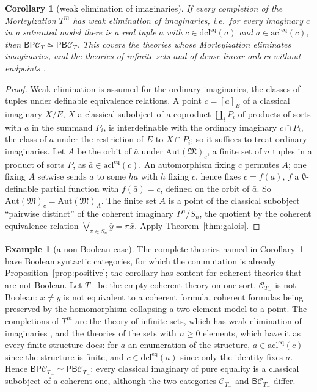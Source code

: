 \documentclass[11pt]{amsart}
\newtheorem{cor}[thm]{Corollary}
\theoremstyle{definition}
\newtheorem{ex}[thm]{Example}
\newcommand{\PP}{\mathsf P}
\newcommand{\BB}{\mathsf B}
\newcommand{\cC}{\mathcal C}
\begin{document}
\begin{cor}[weak elimination of imaginaries]\label{cor:wei}
If every completion of the Morleyization $T^m$ has weak elimination of
imaginaries, i.e.\ for every imaginary $c$ in a saturated model there is
a real tuple
$\bar a$ with $c\in\mathrm{dcl}^{\mathrm{eq}}(\bar a)$ and $\bar a\in
\mathrm{acl}^{\mathrm{eq}}(c)$, then $\BB\PP\cC_T\simeq\PP\BB\cC_T$. This
covers the theories whose Morleyization eliminates imaginaries, and the
theories of infinite sets and of dense linear orders without endpoints
\cite{CF04}.
\end{cor}
\begin{proof}
Weak elimination is assumed for the ordinary imaginaries, the classes
of tuples under definable equivalence relations. A point $c=[a]_E$ of a
classical imaginary $X/E$, $X$ a classical subobject of a coproduct
$\coprod_iP_i$ of products of sorts with $a$ in the summand $P_i$, is
interdefinable with the ordinary imaginary $c\cap P_i$, the class of $a$
under the restriction of $E$ to $X\cap P_i$; so it suffices to treat
ordinary imaginaries.
Let $A$ be the orbit of $\bar a$ under $\mathrm{Aut}(\mathfrak M)_c$, a
finite set of $n$ tuples in a product of sorts $P$, as $\bar a\in
\mathrm{acl}^{\mathrm{eq}}(c)$. An automorphism fixing $c$ permutes
$A$; one fixing $A$ setwise sends $\bar a$ to some $h\bar a$ with $h$
fixing $c$, hence fixes $c=f(\bar a)$, $f$ a $\emptyset$-definable
partial function with $f(\bar a)=c$, defined on the orbit of $\bar a$. So $\mathrm{Aut}(\mathfrak M)_c=
\mathrm{Aut}(\mathfrak M)_A$. The finite set $A$ is a point of the
classical subobject ``pairwise distinct'' of the coherent imaginary
$P^n/S_n$, the quotient by the coherent equivalence relation
$\bigvee_{\pi\in S_n}\bar y=\pi\bar x$. Apply Theorem~\ref{thm:galois}.
\end{proof}

\begin{ex}[a non-Boolean case]\label{ex:equality}
The complete theories named in Corollary~\ref{cor:wei} have Boolean
syntactic categories, for which the commutation is already
Proposition~\ref{prop:positive}; the corollary has content for
coherent theories that are not Boolean. Let $T_=$ be the empty coherent
theory on one sort. $\cC_{T_=}$ is not Boolean: $x\ne y$ is not
equivalent to a coherent formula, coherent formulas being preserved by
the homomorphism collapsing a two-element model to a point. The
completions of $T_=^m$ are the theory of infinite sets, which has weak
elimination of imaginaries \cite{CF04}, and the theories of the sets
with $n\ge0$ elements, which have it as every finite structure does: for
$\bar a$ an enumeration of the structure, $\bar a\in
\mathrm{acl}^{\mathrm{eq}}(c)$ since the structure is finite, and
$c\in\mathrm{dcl}^{\mathrm{eq}}(\bar a)$ since only the identity fixes
$\bar a$. Hence $\BB\PP\cC_{T_=}\simeq\PP\BB\cC_{T_=}$: every classical
imaginary of pure equality is a classical subobject of a coherent one,
although the two categories $\cC_{T_=}$ and $\BB\cC_{T_=}$ differ.
\end{ex}
\end{document}
